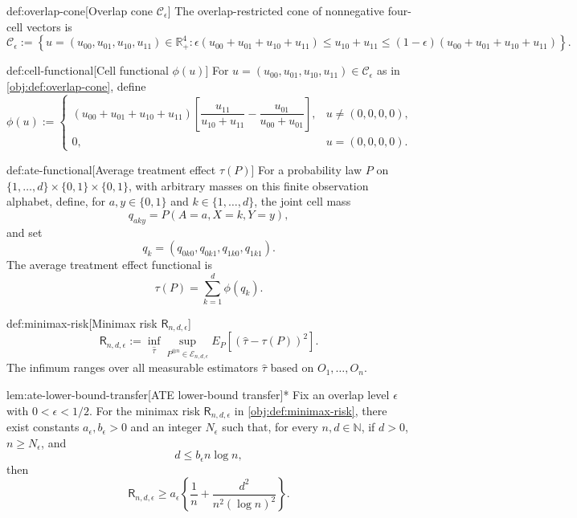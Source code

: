 \begin{definitionv}{def:overlap-cone}[Overlap cone \(\mathcal C_\epsilon\)]
The overlap-restricted cone of nonnegative four-cell vectors is
\[
\mathcal C_\epsilon
:=
\left\{
u=(u_{00},u_{01},u_{10},u_{11})\in\mathbb R_+^4:
\epsilon(u_{00}+u_{01}+u_{10}+u_{11})
\le
u_{10}+u_{11}
\le
(1-\epsilon)(u_{00}+u_{01}+u_{10}+u_{11})
\right\}.
\]
\end{definitionv}

\begin{definitionv}{def:cell-functional}[Cell functional \(\phi(u)\)]
For \(u=(u_{00},u_{01},u_{10},u_{11})\in\mathcal C_\epsilon\) as in \cref{obj:def:overlap-cone}, define
\[
\phi(u)
:=
\begin{cases}
(u_{00}+u_{01}+u_{10}+u_{11})
\left[
\dfrac{u_{11}}{u_{10}+u_{11}}
-
\dfrac{u_{01}}{u_{00}+u_{01}}
\right],
& u\neq(0,0,0,0),\\[1.2em]
0,
& u=(0,0,0,0).
\end{cases}
\]
\end{definitionv}

\begin{definitionv}{def:ate-functional}[Average treatment effect \(\tau(P)\)]
For a probability law \(P\) on \(\{1,\ldots,d\}\times\{0,1\}\times\{0,1\}\), with arbitrary masses on this finite observation alphabet, define, for \(a,y\in\{0,1\}\) and \(k\in\{1,\ldots,d\}\), the joint cell mass
\[
q_{aky}=P(A=a,X=k,Y=y),
\]
and set
\[
q_k=(q_{0k0},q_{0k1},q_{1k0},q_{1k1}).
\]
The average treatment effect functional is
\[
\tau(P)
=
\sum_{k=1}^{d}\phi(q_k).
\]
\end{definitionv}

\begin{definitionv}{def:minimax-risk}[Minimax risk \(\mathsf R_{n,d,\epsilon}\)]
\[
\mathsf R_{n,d,\epsilon}
:=
\inf_{\widehat\tau}
\sup_{P^{\otimes n}\in\mathcal E_{n,d,\epsilon}}
E_P\!\left[(\widehat\tau-\tau(P))^2\right].
\]
The infimum ranges over all measurable estimators \(\widehat\tau\) based on \(O_1,\ldots,O_n\).
\end{definitionv}

\begin{lemmav}{lem:ate-lower-bound-transfer}[ATE lower-bound transfer]*
Fix an overlap level \(\epsilon\) with \(0<\epsilon<1/2\). For the minimax risk \(\mathsf R_{n,d,\epsilon}\) in \cref{obj:def:minimax-risk}, there exist constants \(a_\epsilon,b_\epsilon>0\) and an integer \(N_\epsilon\) such that, for every \(n,d\in\mathbb N\), if \(d>0\), \(n\ge N_\epsilon\), and
\[
d\le b_\epsilon n\log n,
\]
then
\[
\mathsf R_{n,d,\epsilon}
\ge
a_\epsilon\left\{\frac1n+\frac{d^2}{n^2(\log n)^2}\right\}.
\]
\end{lemmav}

